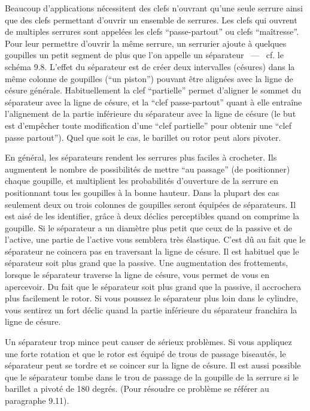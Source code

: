 \documentclass[a4paper,french,11pt,twoside]{report}
\begin{document}
Beaucoup d'applications nécessitent des clefs n'ouvrant qu'une seule serrure ainsi que des clefs permettant d'ouvrir un ensemble de serrures. Les clefs qui ouvrent de multiples serrures sont appelées les clefs \enquote{passe-partout} ou clefs \enquote{maîtresse}. Pour leur permettre d'ouvrir la même serrure, un serrurier ajoute à quelques goupilles un petit segment de plus que l'on appelle un séparateur ~---~ cf. le schéma 9.8. L'effet du séparateur est de créer deux intervalles (césures) dans la même colonne de goupilles (\enquote{un piston}) pouvant être alignées avec la ligne de césure générale. Habituellement la clef \enquote{partielle} permet d'aligner le sommet du séparateur avec la ligne de césure, et la \enquote{clef passe-partout} quant à elle entraîne l'alignement de la partie inférieure du séparateur avec la ligne de césure (le but est d'empêcher toute modification d'une \enquote{clef partielle} pour obtenir une \enquote{clef passe partout}). Quel que soit le cas, le barillet ou rotor peut alors pivoter.

En général, les séparateurs rendent les serrures plus faciles à crocheter. Ils augmentent le nombre de possibilités de mettre \enquote{au passage} (de positionner) chaque goupille, et multiplient les probabilités d'ouverture de la serrure en positionnant tous les goupilles à la bonne hauteur. Dans la plupart des cas seulement deux ou trois colonnes de goupilles seront équipées de séparateurs. Il est aisé de les identifier, grâce à deux déclics perceptibles quand on comprime la goupille. Si le séparateur a un diamètre plus petit que ceux de la passive et de l'active, une partie de l'active vous semblera très élastique. C'est dû au fait que le séparateur ne coincera pas en traversant la ligne de césure. Il est habituel que le séparateur soit plus grand que la passive. Une augmentation des frottements, lorsque le séparateur traverse la ligne de césure, vous permet de vous en apercevoir. Du fait que le séparateur soit plus grand que la passive, il accrochera plus facilement le rotor. Si vous poussez le séparateur plus loin dans le cylindre, vous sentirez un fort déclic quand la partie inférieure du séparateur franchira la ligne de césure.

Un séparateur trop mince peut causer de sérieux problèmes. Si vous appliquez une forte rotation et que le rotor est équipé de trous de passage biseautés, le séparateur peut se tordre et se coincer sur la ligne de césure. Il est aussi possible que le séparateur tombe dans le trou de passage de la goupille de la serrure si le barillet a pivoté de 180 degrés. (Pour résoudre ce problème se référer au paragraphe 9.11).
\end{document}
